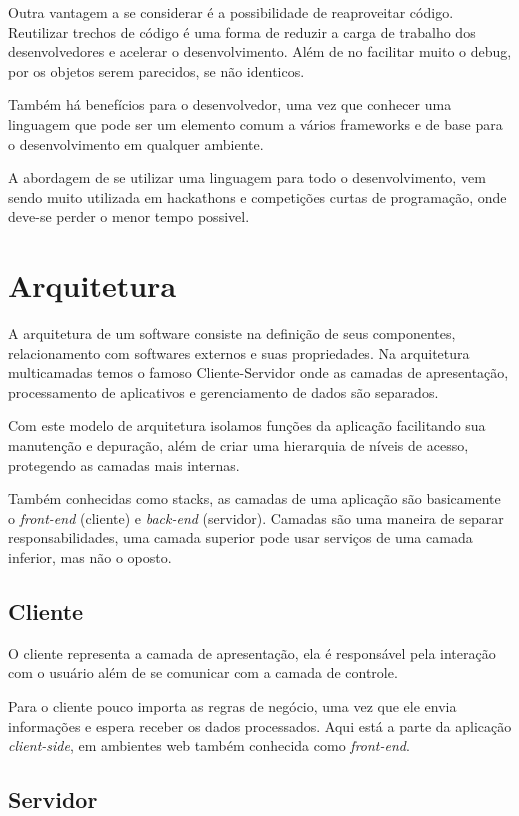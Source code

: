 \documentclass[
	12pt,				%
	openright,			%
	twoside,			%
	a4paper,			%
	english,			%
	brazil				%
	]{abntex2}
\begin{document}
Outra vantagem a se considerar é a possibilidade de reaproveitar código. Reutilizar trechos de código é uma forma de reduzir a carga de trabalho dos desenvolvedores e acelerar o desenvolvimento. Além de no facilitar muito o debug, por os objetos serem parecidos, se não identicos.

Também há benefícios para o desenvolvedor, uma vez que conhecer uma linguagem que pode ser um elemento comum a vários frameworks e de base para o desenvolvimento em qualquer ambiente.

A abordagem de se utilizar uma linguagem para todo o desenvolvimento, vem sendo muito utilizada em hackathons e competições curtas de programação, onde deve-se perder o menor tempo possivel.

\section{Arquitetura}

A arquitetura de um software consiste na definição de seus componentes, relacionamento com softwares externos e suas propriedades. Na arquitetura multicamadas temos o famoso Cliente-Servidor onde as camadas de apresentação, processamento de aplicativos e gerenciamento de dados são separados.

Com este modelo de arquitetura isolamos funções da aplicação facilitando sua manutenção e depuração, além de criar uma hierarquia de níveis de acesso, protegendo as camadas mais internas.

Também conhecidas como stacks, as camadas de uma aplicação são basicamente o \textit{front-end} (cliente) e \textit{back-end} (servidor). Camadas são uma maneira de separar responsabilidades, uma camada superior pode usar serviços de uma camada inferior, mas não o oposto.

\subsection{Cliente}

O cliente representa a camada de apresentação, ela é responsável pela interação com o usuário além de se comunicar com a camada de controle. 

Para o cliente pouco importa as regras de negócio, uma vez que ele envia informações e espera receber os dados processados. Aqui está a parte da aplicação \textit{client-side}, em ambientes web também conhecida como \textit{front-end}.

\subsection{Servidor}
\end{document}
